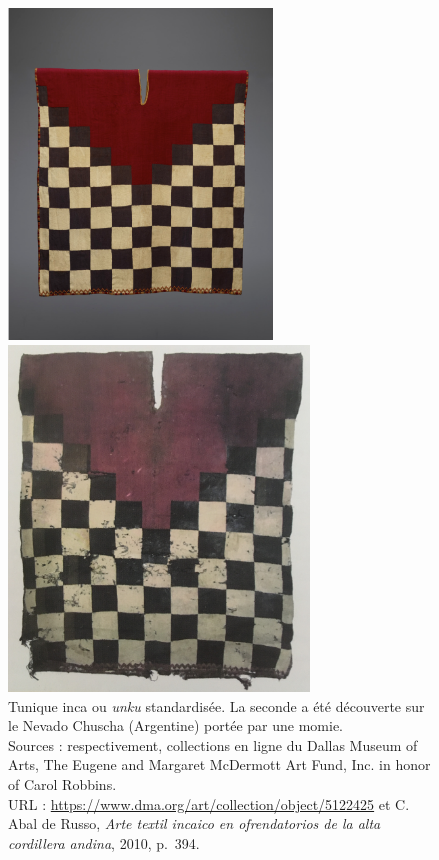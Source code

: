 \begin{figure}[!h]
	\begin{minipage}[c]{.5\linewidth}
        		\begin{center}
        			\includegraphics[width=7cm]{../images/unku_DMA.png}
        		\end{center}
	\end{minipage}
	\begin{minipage}[c]{.5\linewidth}
        		\begin{center}
			\includegraphics[width=8cm]{../images/unku_volcan.JPG}
        		\end{center}
	\end{minipage}
	\caption[Tunique inca ou \textit{unku} standardisée.]{Tunique inca ou \textit{unku} standardisée. La seconde a été découverte sur le Nevado Chuscha (Argentine) portée par une momie.\\ Sources : respectivement, collections en ligne du Dallas Museum of Arts, The Eugene and Margaret McDermott Art Fund, Inc. in honor of Carol Robbins. \\ URL : \url{https://www.dma.org/art/collection/object/5122425} et C. Abal de Russo, \textit{Arte textil incaico en ofrendatorios de la alta cordillera andina}, 2010, p.~394.}
	\label{fig:damier}
\end{figure}

